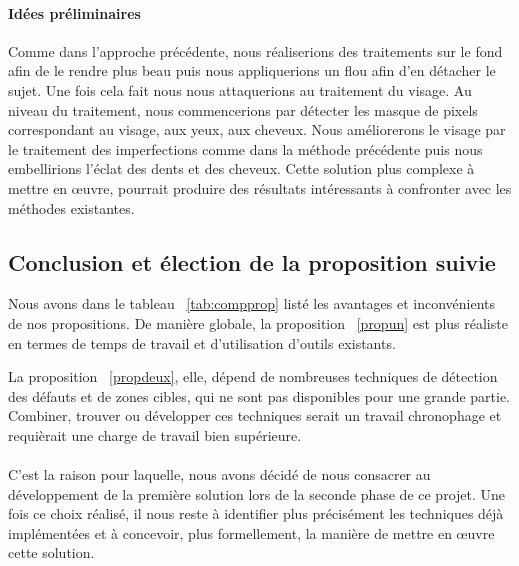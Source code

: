 \documentclass[11pt, french,screen]{report-rd-info}
\begin{document}
\paragraph{Idées préliminaires}
Comme dans l’approche précédente, nous réaliserions des traitements sur le fond afin de le rendre plus beau puis nous appliquerions un flou afin d’en détacher le sujet. Une fois cela fait nous nous attaquerions au traitement du visage. Au niveau du traitement, nous commencerions par détecter les masque de pixels correspondant au visage, aux yeux, aux cheveux. Nous améliorerons le visage par le traitement des imperfections comme dans la méthode précédente puis nous embellirions l’éclat des dents et des cheveux.
Cette solution plus complexe à mettre en œuvre, pourrait produire des résultats intéressants à confronter avec les méthodes existantes.
\subsection{Conclusion et élection de la proposition suivie}
Nous avons dans le tableau ~\ref{tab:compprop} listé les avantages et inconvénients de nos propositions. De manière globale, la proposition ~\ref{propun} est plus réaliste en termes de temps de travail et d’utilisation d’outils existants. 

La proposition ~\ref{propdeux}, elle, dépend de nombreuses techniques de détection des défauts et de zones cibles, qui ne sont pas disponibles pour une grande partie. Combiner, trouver ou développer ces techniques serait un travail chronophage et requièrait une charge de travail bien supérieure. 
\paragraph*{}
C’est la raison pour laquelle, nous avons décidé de nous consacrer au développement de la première solution lors de la seconde phase de ce projet. Une fois ce choix réalisé, il nous reste à identifier plus précisément les techniques déjà implémentées
et à concevoir, plus formellement, la manière de mettre en œuvre cette solution.
\end{document}
